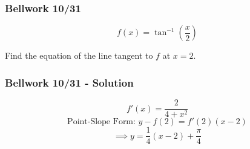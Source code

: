 \documentclass[12pt]{beamer}
\begin{document}
\begin{frame}
	\frametitle{Bellwork 10/31}
	\initclock

	\vfill
	\vfill
	\vfill
	\vfill
	\Large
	\[f(x)=\tan^{-1}\left(\frac{x}{2}\right)\]
	\vfill
	\large
	\begin{center}
		Find the equation of the line tangent to $f$ at $x=2$.
	\end{center}
	\vfill
	\vfill
	\vfill
	\vfill
	\vfill
	\vfill
	\vfill

	\small
	\crono
\end{frame}
\begin{frame}
	\frametitle{Bellwork 10/31 - Solution}

	\Large
	\[f'(x)=\frac{2}{4+x^2}\]
	\vfill
	\large
	\[\text{Point-Slope Form: }y-f(2)=f'(2)(x-2)\]
	\[\implies y=\frac{1}{4}(x-2)+\frac{\pi}{4}\]
\end{frame}
\end{document}
